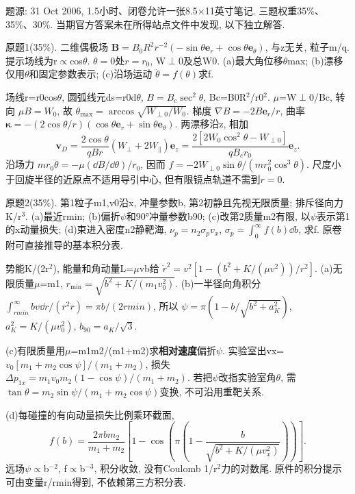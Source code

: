题源: 31 Oct 2006, 1.5小时、闭卷允许一张8.5\ensuremath{\times}11英寸笔记. 三题权重35\%、35\%、30\%. 当期官方答案未在所得站点文件中发现, 以下独立解答.
\begin{exercise}\label{ex:06-mid-1}
原题1(35\%). 二维偶极场 $\mathbf B=B_0R^2r^{-2}(-\sin\theta\mathbf e_r+\cos\theta\mathbf e_\theta)$, 与z无关, 粒子m/q. 提示场线为r\ensuremath{\propto}cos\ensuremath{\theta}. $\theta=0$处$r=r_0$, W\ensuremath{\perp}0及总W0. (a)最大角位移\ensuremath{\theta}max; (b)漂移仅用\ensuremath{\theta}和固定参数表示; (c)沿场运动 $\ddot\theta=f(\theta)$求f.
\end{exercise}
\begin{solution}
场线r=r0cos\ensuremath{\theta}, 圆弧线元ds=r0d\ensuremath{\theta}, $B=B_c\sec^2\theta$, Bc=B0R\ensuremath{{}^{2}}/r0\ensuremath{{}^{2}}. \ensuremath{\mu}=W\ensuremath{\perp}0/Bc, 转向 $\mu B=W_0$, 故 $\theta_{\max}=\arccos\sqrt{W_{\perp0}/W_0}$. 梯度 $\nabla B=-2B\mathbf e_r/r$, 曲率 $\boldsymbol\kappa=-(2\cos\theta/r)(\cos\theta\mathbf e_r+\sin\theta\mathbf e_\theta)$. 两漂移沿z, 相加
\begin{equation}
 \mathbf v_D=\frac{2\cos\theta}{qBr}(W_\perp+2W_\parallel)\mathbf e_z
 =\frac{2[2W_0\cos^2\theta-W_{\perp0}]}{qB_cr_0}\mathbf e_z.
\end{equation}
沿场力 $mr_0\ddot\theta=-\mu(\dd B/\dd\theta)/r_0$, 因而 $f=-2W_{\perp0}\sin\theta/(mr_0^2\cos^3\theta)$. 尺度小于回旋半径的近原点不适用导引中心, 但有限镜点轨道不需到$r=0$.
\end{solution}
\begin{exercise}\label{ex:06-mid-2}
原题2(35\%). 第1粒子m1,v0沿x, 冲量参数b, 第2初静且先视无限质量; 排斥径向力K/r\ensuremath{{}^{3}}. (a)最近rmin; (b)偏折\ensuremath{\psi}和90°冲量参数b90; (c)改第2质量m2有限, 以\ensuremath{\psi}表示第1的x动量损失; (d)束进入密度n2静靶海, $\nu_p=n_2\sigma_pv_x$, $\sigma_p=\int_0^\infty f(b)\dd b$, 求f. 原卷附可直接推导的基本积分表.
\end{exercise}
\begin{solution}
势能K/(2r\ensuremath{{}^{2}}), 能量和角动量L=\ensuremath{\mu}vb给
$\dot r^2=v^2[1-(b^2+K/(\mu v^2))/r^2]$.
(a)无限质量\ensuremath{\mu}=m1, $r_{\min}=\sqrt{b^2+K/(m_1v_0^2)}$. (b)一半径向角积分 $\int_{rmin}^\infty bv\dd r/(r^2\dot r)=\pi b/(2rmin)$, 所以 $\psi=\pi(1-b/\sqrt{b^2+a_K^2})$, $a_K^2=K/(\mu v_0^2)$, $b_{90}=a_K/\sqrt3$.

(c)有限质量用\ensuremath{\mu}=m1m2/(m1+m2)求\textbf{相对速度}偏折\ensuremath{\psi}. 实验室出vx=$v_0[m_1+m_2\cos\psi]/(m_1+m_2)$, 损失 $\Delta p_{1x}=m_1v_0m_2(1-\cos\psi)/(m_1+m_2)$. 若把\ensuremath{\psi}改指实验室角\ensuremath{\theta}, 需 $\tan\theta=m_2\sin\psi/(m_1+m_2\cos\psi)$变换, 不可沿用重靶关系.

(d)每碰撞的有向动量损失比例乘环截面,
\begin{equation}
 f(b)=\frac{2\pi b m_2}{m_1+m_2}\left[1-\cos\left(\pi\left(1-\frac b{\sqrt{b^2+K/(\mu v_x^2)}}\right)\right)\right].
\end{equation}
远场\ensuremath{\psi}\ensuremath{\propto}b$^{-2}$, f\ensuremath{\propto}b$^{-3}$, 积分收敛, 没有Coulomb 1/r\ensuremath{{}^{2}}力的对数尾. 原件的积分提示可由变量r/rmin得到, 不依赖第三方积分表.
\end{solution}
